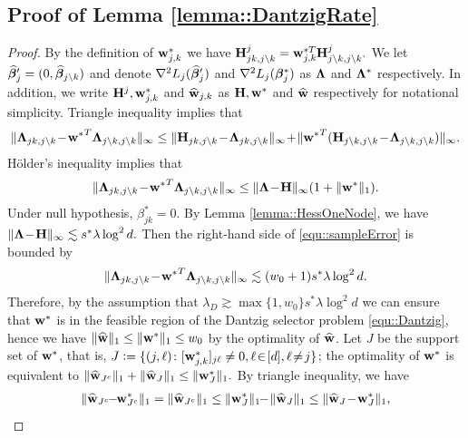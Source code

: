 \documentclass[twoside,11pt]{article}
\newcommand{\defeq}{\vcentcolon=}
\newcommand*{\hbbeta}{\hat{\bbeta}}
\newcommand*{\bbetas}{\bbeta^*}
\newcommand*{\hw}{\hat{\wb}}
\newcommand*{\sw}{\wb^*}
\begin{document}
\subsection{Proof of Lemma \ref{lemma::DantzigRate}}\label{proof::lemma::DantzigRate}
\begin{proof} 
By the definition of $\sw_{j,k}$ we have $\Hb_{jk, j\setminus k}^j = {\sw_{j,k}}\!\!\!\!^T \Hb_{j\setminus k, j\setminus k}^{j}.$ We let $\hbbeta_j' = (0,\hbbeta_{j\setminus k})$ and denote $\nabla^2 L_j(\hbbeta_j')$ and $\nabla^2 L_j(\bbetas_j)$ as $\bm{\Lambda}$ and $\bm{\Lambda}^*$ respectively. In addition, we write $\Hb^{j}, \sw_{j,k}$ and $\hw_{j,k}$ as $\Hb,\sw$ and $\hw $ respectively  for notational simplicity.  Triangle inequality implies that  
\begin{align*}
 \|\bLambda_{jk,j\setminus k} \!-\! {\sw}^T \bLambda_{j\setminus k,j\setminus k}  \|_\infty \leq \|\Hb_{jk,j\setminus k}\! -\! \bLambda_{jk,j\setminus k} \|_{\infty}\!+\!  \|{\sw}^T ( \Hb_{j\setminus k,j\setminus k}\!  -\! \bLambda_{j\setminus k,j\setminus k} )  \|_{\infty}.
\end{align*}
H\"{o}lder's inequality implies that 
\begin{align}\label{equ::sampleError}
\|\bLambda_{jk,j\setminus k} \!-\! {\sw}^T \bLambda_{j\setminus k,j\setminus k}   \|_\infty
\leq  \| \bLambda \!-\! \Hb \| _{\infty} ( 1+  \| \sw \|_{1} ).
\end{align}
Under null hypothesis, $\beta_{jk}^* = 0$. By Lemma \ref{lemma::HessOneNode}, we have 
$ \|\bm{\Lambda}\! -\! \mathbf{H} \| _{\infty} 
\lesssim s^* \lambda \log^2 d .
$
Then the right-hand side of \eqref{equ::sampleError} is bounded by 
\begin{align*}%
 \|\bLambda_{jk,j\setminus k}\! -\! {\sw}^T \bLambda_{j\setminus k,j\setminus k}  \|_\infty \lesssim(w_0  +1)   s^* \lambda\log^2 d.
\end{align*}
Therefore, by the assumption that  $\lambda_D \gtrsim  \max\{1,w_0 \}s^* \lambda \log^2 d$ we can ensure that $\sw$ is in the feasible region of the Dantzig selector problem \eqref{equ::Dantzig}, hence we have 
$ \|\hw \|_{1} \leq  \| \sw \|_{1} \leq w_0$ by the optimality 
of $\hw$.
Let $J$ be the support set of $\sw$, that is, 
$J \defeq \{ (j,\ell)\colon [\sw_{j,k}]_{j\ell} \neq 0,\ell\!\in \![d],\ell\!\neq \!j \}$;
 the optimality of $\sw$ is equivalent to $ \| \hw_{J^c}   \|_1  +  \| \hw_{J}  \|_1  \leq  \| \sw_{J}  \|_1.$
By triangle inequality, we have 
\begin{align}\label{equ::boundHWcone}
  \| \hw_{J^c} \!\!-\!\! \sw_{J^c} \|_1 =   \| \hw_{J^c}  \|_1 \leq   \| \sw_{J}   \|_1 \!\!-\!  \| \hw_{J}  \|_1 \leq  \| \hw_J\!-\! \sw_{J}   \|_1 ,

\end{align}
\end{proof}
\end{document}
